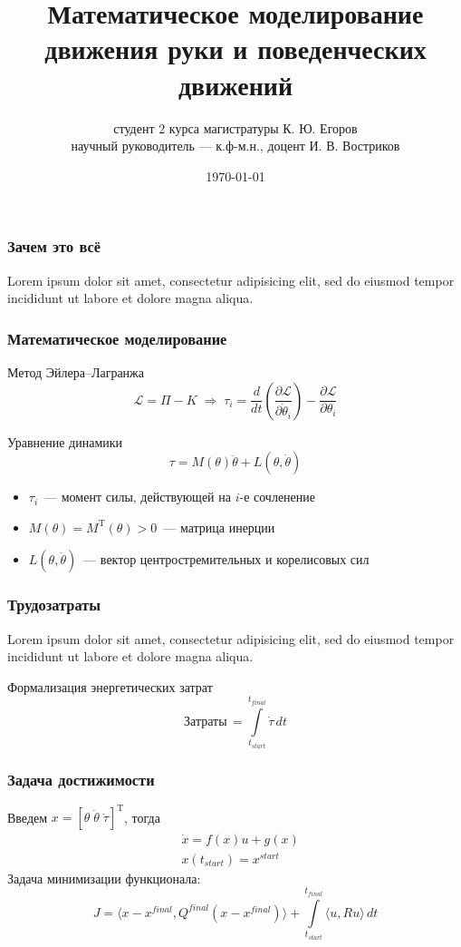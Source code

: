 \documentclass[16pt]{beamer}
\title[Конференция <<Ломоносовские чтения 2023>>]
        {Математическое моделирование движения руки и поведенческих движений}
\author[К. Ю. Егоров]
        {студент 2 курса магистратуры К. Ю. Егоров\\
        научный руководитель --- к.ф-м.н., доцент И. В. Востриков}
\institute{Кафедра системного анализа\\ ВМК МГУ}
\date{\today}
\begin{document}
    \begin{frame}
        \titlepage
    \end{frame}

    \begin{frame}
        \frametitle{Зачем это всё}
        Lorem ipsum dolor sit amet, consectetur adipisicing elit, sed do eiusmod tempor incididunt ut labore et dolore magna aliqua.
    \end{frame}

    \begin{frame}
        \frametitle{Математическое моделирование}
        Метод Эйлера--Лагранжа
        $$
            \mathcal{L} = \Pi - K
            \;\Longrightarrow\;
            \tau_i
            =
              \frac{d}{dt}\left(\frac{\partial \mathcal{L}}{\partial \dot \theta_i}\right)
            - \frac{\partial \mathcal{L}}{\partial \theta_i}
        $$
        \begin{block}{Уравнение динамики}
            $$
                \tau = M(\theta)\ddot\theta + L(\theta, \dot\theta)
            $$
            \begin{itemize}
                \item $\tau_i$~--- момент силы, действующей на $i$-е сочленение
                \item $M(\theta)=M^{\mathrm{T}}(\theta)>0$~--- матрица инерции
                \item $L(\theta, \dot\theta)$~--- вектор центростремительных и корелисовых сил
            \end{itemize}
        \end{block}
    \end{frame}

    \begin{frame}
        \frametitle{Трудозатраты}
        Lorem ipsum dolor sit amet, consectetur adipisicing elit, sed do eiusmod tempor incididunt ut labore et dolore magna aliqua.
        \begin{block}{Формализация энергетических затрат}
            $$
                \mbox{Затраты}\, = \int\limits_{t_{start}}^{t_{final}}\dot\tau\,dt
            $$
        \end{block}
    \end{frame}

    \begin{frame}
        \frametitle{Задача достижимости}
        Введем $x = [\theta\;\dot\theta\;\dot \tau]^{\mathrm{T}}$, тогда
        \begin{align*}
            &\dot x = f(x)u + g(x)\\
            &x(t_{start}) = x^{start}
        \end{align*}
        Задача минимизации функционала:
        $$
            J = \langle x-x^{final}, Q^{final}(x-x^{final}) \rangle + \int\limits_{t_{start}}^{t_{final}}\langle u, Ru\rangle\,dt
        $$
    \end{frame}
\end{document}
